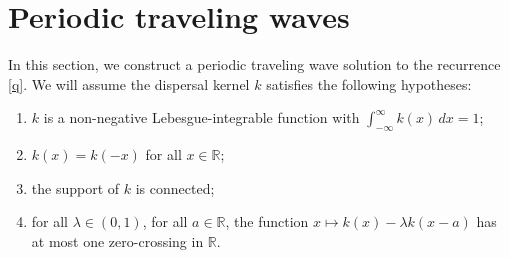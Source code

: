 \documentclass[11pt]{article}
\newtheorem{prop}[thm]{Proposition}
\theoremstyle{definition}
\newtheorem{rem}[thm]{Remark}
\numberwithin{equation}{section}
\numberwithin{thm}{section}
\begin{document}
\section{Periodic traveling waves}

In this section, we construct a periodic traveling wave solution to the recurrence \eqref{q}. We will assume the dispersal kernel $k$ satisfies the following hypotheses:

\def\Hone{(\text{H1})}
\def\Htwo{(\text{H2})}
\def\Hthree{(\text{H3})}
\def\Hfour{(\text{H4})}


\begin{enumerate}[(H1)]
\item $k$ is a non-negative Lebesgue-integrable function with $\int_{-\infty}^{\infty} k(x) \, dx = 1$;

\item $k(x)=k(-x)$ for all $x\in\mathbb R$;

\item the support of $k$ is connected;

\item  for all $\lambda\in(0,1)$, for all $a\in\mathbb R$, the function $x \mapsto k(x)-\lambda k(x-a)$ has at most one zero-crossing in $\mathbb R$.
\end{enumerate}


%
\end{document}

